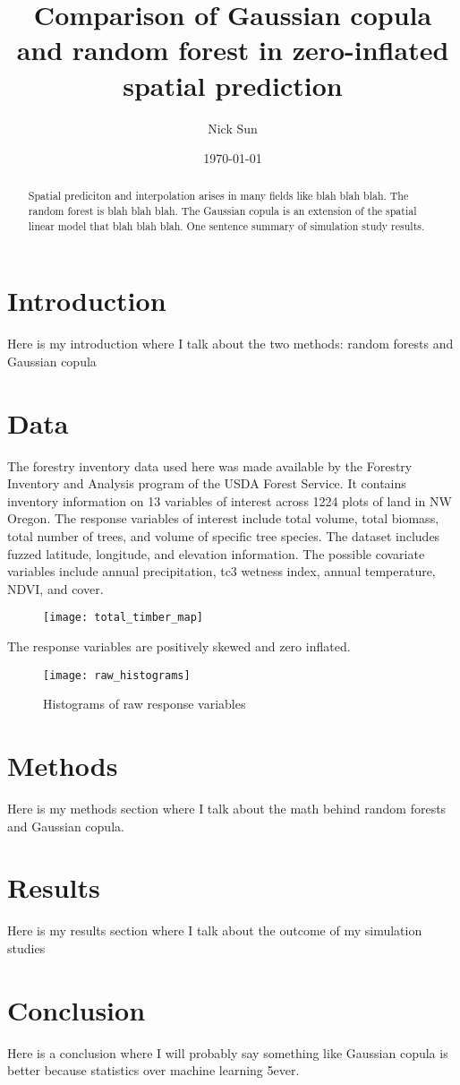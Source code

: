 \documentclass{article}
\title{Comparison of Gaussian copula and random forest in zero-inflated spatial prediction}
\date{\today}
\author{Nick Sun}
\begin{document}
\maketitle

\begin{abstract}
	Spatial prediciton and interpolation arises in many fields like blah blah blah.
	The random forest is blah blah blah.
	The Gaussian copula is an extension of the spatial linear model that blah blah blah.
	One sentence summary of simulation study results.
\end{abstract}

\section{Introduction}
Here is my introduction where I talk about the two methods: random forests\cite{rfsp} and Gaussian copula \cite{madsen09}

\section{Data}
The forestry inventory data used here was made available by the Forestry Inventory and Analysis program of the USDA Forest Service.
It contains inventory information on 13 variables of interest across 1224 plots of land in NW Oregon.
The response variables of interest include total volume, total biomass, total number of trees, and volume of specific tree species.
The dataset includes fuzzed latitude, longitude, and elevation information.
The possible covariate variables include annual precipitation, tc3\cite{raynolds16} wetness index, annual temperature, NDVI, and cover.

\begin{figure}[ht]
\texttt{[image: total\_timber\_map]}
\centering
\end{figure}

The response variables are positively skewed and zero inflated.

\begin{figure}[ht]
	\texttt{[image: raw\_histograms]}
	\centering
	\caption{Histograms of raw response variables}
\end{figure}

\section{Methods}
Here is my methods section where I talk about the math behind random forests and Gaussian copula\cite{verhoef02}.

\section{Results}
Here is my results section where I talk about the outcome of my simulation studies

\section{Conclusion}
Here is a conclusion where I will probably say something like Gaussian copula is better because statistics over machine learning 5ever.

\printbibliography
\end{document}
